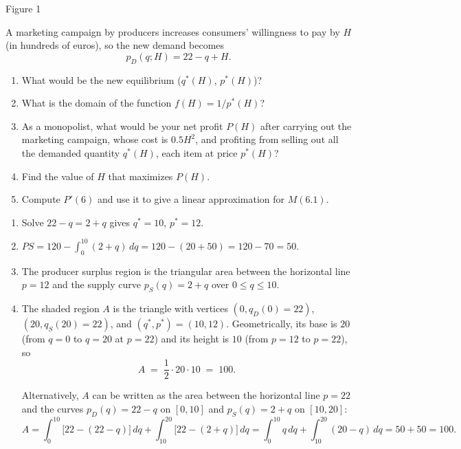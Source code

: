 \documentclass[11pt]{exam}
\begin{document}
\begin{questions}
\begin{minipage}{0.35\textwidth}
\begin{center}
{\small Figure 1}
\end{center}
\end{minipage}

A marketing campaign by producers increases consumers’ willingness to pay by $H$ (in hundreds of euros), so the new demand becomes
\[
p_D(q;H)=22 - q + H.
\]

\begin{enumerate}[label=(\alph*), leftmargin=0.5cm, start=5]
  \item What would be the new equilibrium ($q^*(H)$, $p^*(H)$)?
  \item What is the domain of the function $f(H) = 1/p^*(H)$?
  \item As a monopolist, what would be your net profit $P(H)$ after carrying out the marketing campaign, whose cost is $0.5H^2$, and profiting from selling out all the demanded quantity $q^*(H)$, each item at price $p^*(H)$?
  \item Find the value of $H$ that maximizes $P(H)$.
  \item Compute $P'(6)$ and use it to give a linear approximation for $M(6.1)$.
\end{enumerate}

\begin{solution}
\begin{enumerate}[label=(\alph*)]
  \item Solve $22-q=2+q$ gives $q^*=10$, $p^*=12$.
  \item $PS = 120-\int_0^{10}(2+q)\,dq=120-(20+50)=120-70=50.$
    \item The producer surplus region is the triangular area between the horizontal line \(p=12\) and the supply curve \(p_S(q)=2+q\) over \(0\le q\le10\).
  \item The shaded region $A$ is the triangle with vertices $(0,q_D(0) = 22)$, $(20,q_S(20) = 22)$, and $(q^*,p^*) = (10,12)$.
    Geometrically, its base is $20$ (from $q=0$ to $q=20$ at $p=22$) and its height is $10$ (from $p=12$ to $p=22$), so
    \[
    A \;=\; \frac12 \cdot 20 \cdot 10 \;=\; 100.
    \]

    Alternatively, $A$ can be written as the area between the horizontal line $p=22$ and the curves
    $p_D(q)=22-q$ on $[0,10]$ and $p_S(q)=2+q$ on $[10,20]$:
    \[
    A
    = \int_0^{10}\bigl[22 - (22 - q)\bigr]\,dq
      + \int_{10}^{20}\bigl[22 - (2 + q)\bigr]\,dq
    = \int_0^{10} q\,dq + \int_{10}^{20} (20 - q)\,dq
    = 50 + 50 = 100.
    \]


\end{enumerate}
\end{solution}
\end{questions}
\end{document}
